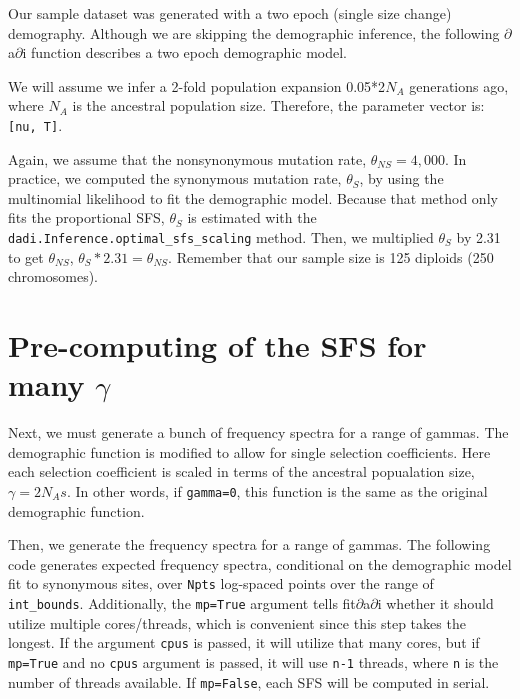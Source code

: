 \documentclass[11pt]{article}
\begin{document}
Our sample dataset was generated with a two epoch (single size change) demography. Although we are skipping the demographic inference, the following $\partial$a$\partial$i function describes a two epoch demographic model.



We will assume we infer a 2-fold population expansion 0.05*2$N_A$ generations ago, where $N_A$ is the ancestral population size. Therefore, the parameter vector is: \texttt{[nu, T]}.



Again, we assume that the nonsynonymous mutation rate, $\theta_{NS}=4,000$. In practice, we computed the synonymous mutation rate, $\theta_S$, by using the multinomial likelihood to fit the demographic model. Because that method only fits the proportional SFS, $\theta_S$ is estimated with the \texttt{dadi.Inference.optimal\_sfs\_scaling} method. Then, we multiplied $\theta_S$ by 2.31 to get $\theta_{NS}$, $\theta_S * 2.31 = \theta_{NS}$. Remember that our sample size is 125 diploids (250 chromosomes).



\section{Pre-computing of the SFS for many $\gamma$}

Next, we must generate a bunch of frequency spectra for a range of gammas. The demographic function is modified to allow for single selection coefficients. Here each selection coefficient is scaled in terms of the ancestral popualation size, $\gamma=2N_As$. In other words, if \texttt{gamma=0}, this function is the same as the original demographic function.



Then, we generate the frequency spectra for a range of gammas. The following code generates expected frequency spectra, conditional on the demographic model fit to synonymous sites, over \texttt{Npts} log-spaced points over the range of \texttt{int\_bounds}. Additionally, the \texttt{mp=True} argument tells fit$\partial$a$\partial$i whether it should utilize multiple cores/threads, which is convenient since this step takes the longest. If the argument \texttt{cpus} is passed, it will utilize that many cores, but if \texttt{mp=True} and no \texttt{cpus} argument is passed, it will use \texttt{n-1} threads, where \texttt{n} is the number of threads available. If \texttt{mp=False}, each SFS will be computed in serial.
\end{document}
